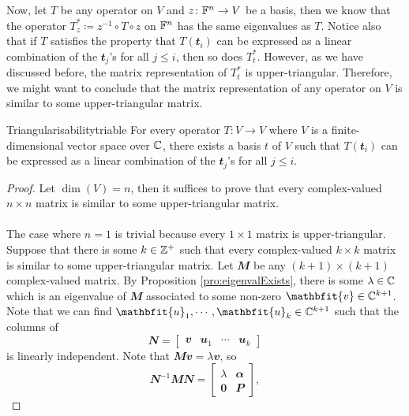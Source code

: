 \documentclass[math, code]{amznotes}
\theoremstyle{remark}
\newcommand{\zero}{\mathbf{0}}
\begin{document}
Now, let $T$ be any operator on $V$ and $z \colon \mathbb{F}^n \to V$ be a basis, then we know that the operator $T^*_z \coloneqq z^{-1} \circ T \circ z$ on $\mathbb{F}^n$ has the same eigenvalues as $T$. Notice also that if $T$ satisfies the property that $T(\mathbfit{t}_i)$ can be expressed as a linear combination of the $\mathbfit{t}_j$'s for all $j \leq i$, then so does $T^*_t$. However, as we have discussed before, the matrix representation of $T^*_t$ is upper-triangular. Therefore, we might want to conclude that the matrix representation of any operator on $V$ is similar to some upper-triangular matrix.
\begin{thmbox}{Triangularisability}{triable}
    For every operator $T \colon V \to V$ where $V$ is a finite-dimensional vector space over $\mathbb{C}$, there exists a basis $t$ of $V$ such that $T(\mathbfit{t}_i)$ can be expressed as a linear combination of the $\mathbfit{t}_j$'s for all $j \leq i$.
    \tcblower
    \begin{proof}
        Let $\dim(V) = n$, then it suffices to prove that every complex-valued $n \times n$ matrix is similar to some upper-triangular matrix. 
        \\\\
        The case where $n = 1$ is trivial because every $1 \times 1$ matrix is upper-triangular. Suppose that there is some $k \in \mathbb{Z}^+$ such that every complex-valued $k \times k$ matrix is similar to some upper-triangular matrix. Let $\mathbfit{M}$ be any $(k + 1) \times (k + 1)$ complex-valued matrix. By Proposition \ref{pro:eigenvalExists}, there is some $\lambda \in \mathbb{C}$ which is an eigenvalue of $\mathbfit{M}$ associated to some non-zero $\mathbfit{v} \in \C^{k + 1}$. Note that we can find $\mathbfit{u}_1, \cdots, \mathbfit{u}_k \in \C^{k + 1}$ such that the columns of 
        \begin{equation*}
            \mathbfit{N} = \begin{bmatrix}
                \mathbfit{v} & \mathbfit{u}_1 & \cdots & \mathbfit{u}_k
            \end{bmatrix}
        \end{equation*}
        is linearly independent. Note that $\mathbfit{Mv} = \lambda\mathbfit{v}$, so
        \begin{equation*}
            \mathbfit{N}^{-1}\mathbfit{MN} = \begin{bmatrix}
                \lambda & \mathbfit{\alpha} \\
                \zero & \mathbfit{P}
            \end{bmatrix},

\end{equation*}
\end{proof}
\end{thmbox}
\end{document}
